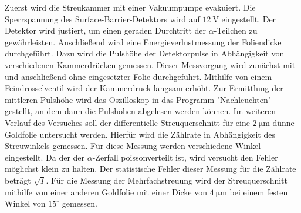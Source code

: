 Zuerst wird die Streukammer mit einer Vakuumpumpe evakuiert. Die Sperrspannung des Surface-Barrier-Detektors wird auf $\SI{12}{\volt}$ eingestellt. Der Detektor wird justiert, um einen geraden Durchtritt  der $\alpha$-Teilchen zu gewährleisten. Anschließend wird eine Energieverlustmessung der Foliendicke durchgeführt. Dazu wird die Pulshöhe der Detektorpulse in Abhängigkeit von verschiedenen Kammerdrücken gemessen. Dieser Messvorgang wird zunächst mit und anschließend ohne eingesetzter Folie durchgeführt. Mithilfe von einem Feindrosselventil wird der Kammerdruck langsam erhöht. Zur Ermittlung der mittleren Pulshöhe wird das Oszilloskop in das Programm "Nachleuchten" gestellt, an dem dann die Pulshöhen abgelesen werden können. Im weiteren Verlauf des Versuches soll der differentielle Streuquerschnitt für eine $\SI{2}{\micro\meter}$ dünne Goldfolie untersucht werden. Hierfür wird die Zählrate in Abhängigkeit des Streuwinkels gemessen. Für diese Messung werden verschiedene Winkel eingestellt. Da der der $\alpha$-Zerfall poissonverteilt ist, wird versucht den Fehler möglichst klein zu halten. Der statistische Fehler dieser Messung für die Zählrate beträgt $\sqrt{I}$. Für die Messung der Mehrfachstreuung wird der Streuquerschnitt mithilfe von einer anderen Goldfolie mit einer Dicke von $\SI{4}{\micro\meter}$ bei einem festen Winkel von $15 ^\circ$ gemessen.

